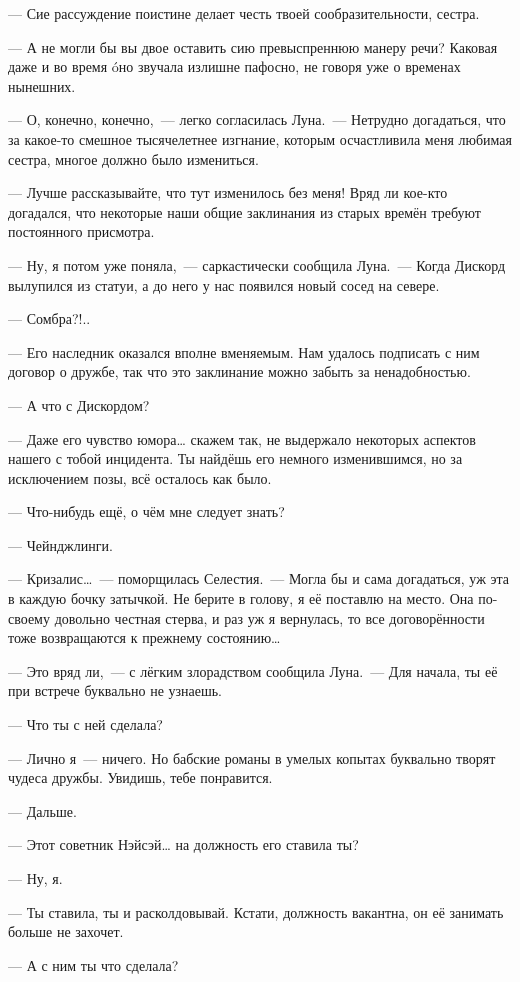 \documentclass[twoside,a5paper,12pt]{extbook}
\begin{document}
— Сие рассуждение поистине делает честь твоей сообразительности, сестра.

— А не могли бы вы двое оставить сию превыспреннюю манеру речи? Каковая даже и во время óно звучала излишне пафосно, не говоря уже о временах нынешних.

— О, конечно, конечно, — легко согласилась Луна. — Нетрудно догадаться, что за какое-то смешное тысячелетнее изгнание, которым осчастливила меня любимая сестра, многое должно было измениться.

— Лучше рассказывайте, что тут изменилось без меня! Вряд ли кое-кто догадался, что некоторые наши общие заклинания из старых времён требуют постоянного присмотра.

— Ну, я потом уже поняла, — саркастически сообщила Луна. — Когда Дискорд вылупился из статуи, а до него у нас появился новый сосед на севере.

— Сомбра?!..

— Его наследник оказался вполне вменяемым. Нам удалось подписать с ним договор о дружбе, так что это заклинание можно забыть за ненадобностью.

— А что с Дискордом?

— Даже его чувство юмора… скажем так, не выдержало некоторых аспектов нашего с тобой инцидента. Ты найдёшь его немного изменившимся, но за исключением позы, всё осталось как было.

— Что-нибудь ещё, о чём мне следует знать?

— Чейнджлинги.

— Кризалис… — поморщилась Селестия. — Могла бы и сама догадаться, уж эта в каждую бочку затычкой. Не берите в голову, я её поставлю на место. Она по-своему довольно честная стерва, и раз уж я вернулась, то все договорённости тоже возвращаются к прежнему состоянию…

— Это вряд ли, — с лёгким злорадством сообщила Луна. — Для начала, ты её при встрече буквально не узнаешь.

— Что ты с ней сделала?

— Лично я — ничего. Но бабские романы в умелых копытах буквально творят чудеса дружбы. Увидишь, тебе понравится.

— Дальше.

— Этот советник Нэйсэй… на должность его ставила ты?

— Ну, я.

— Ты ставила, ты и расколдовывай. Кстати, должность вакантна, он её занимать больше не захочет.

— А с ним ты что сделала?
\end{document}
